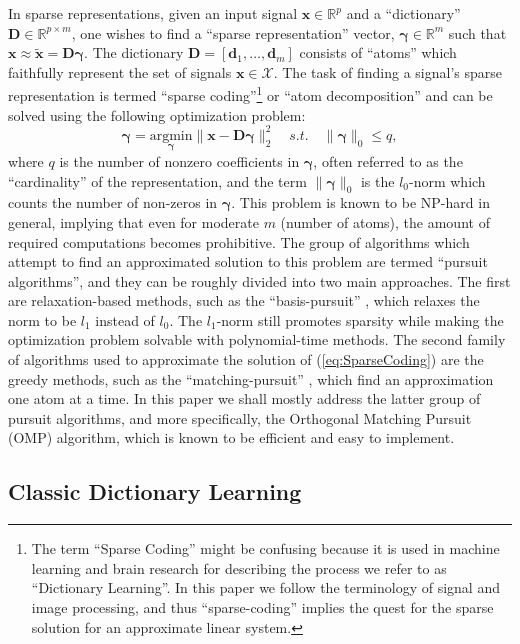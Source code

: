 \documentclass[journal]{IEEEtran}
\newcommand{\bD}{\mathbf{D}}
\newcommand{\bd}{\mathbf{d}}
\newcommand{\bx}{\mathbf{x}}
\newcommand{\cX}{\mathcal{X}}
\newcommand{\bgamma}{\boldsymbol{\gamma}}
\begin{document}
In sparse representations, given an input signal $\bx \in \mathbb{R}^p$ and a ``dictionary'' $\bD \in \mathbb{R}^{p \times m}$, one wishes to find a ``sparse representation'' vector, $\bgamma \in \mathbb{R}^m$ such that $\bx \approx \tilde{\bx} = \bD \bgamma$. The dictionary $\bD = \left[\bd_1,\ldots,\bd_m\right]$ consists of ``atoms'' which faithfully represent the set of signals $\bx \in \cX$. The task of finding a signal's sparse representation is termed ``sparse coding''\footnote{The term ``Sparse Coding'' might be confusing because it is used in machine learning and brain research for describing the process we refer to as ``Dictionary Learning''. In this paper we follow the terminology of signal and image processing, and thus ``sparse-coding'' implies the quest for the sparse solution for an approximate linear system.} or ``atom decomposition'' and can be solved using the following optimization problem:
\begin{equation}\label{eq:SparseCoding}
    \bgamma = \underset{\bgamma}{\text{argmin}} \| \bx - \bD \bgamma \|_2^2 \quad s.t. \quad \| \bgamma \|_0 \leq \mathit{q},
\end{equation}
where $q$ is the number of nonzero coefficients in $\bgamma$, often referred to as the ``cardinality'' of the representation, and the term $\|\bgamma\|_0$ is the $l_0$-norm which counts the number of non-zeros in $\bgamma$. This problem is known to be NP-hard in general, implying that even for moderate $m$ (number of atoms), the amount of required computations becomes prohibitive. The group of algorithms which attempt to find an approximated solution to this problem are termed ``pursuit algorithms'', and they can be roughly divided into two main approaches.
The first are relaxation-based methods, such as the ``basis-pursuit'' \cite{basePursuit}, which relaxes the norm to be $l_1$ instead of $l_0$. The $l_1$-norm still promotes sparsity while making the optimization problem solvable with polynomial-time methods. The second family of algorithms used to approximate the solution of (\ref{eq:SparseCoding}) are the greedy methods, such as the ``matching-pursuit'' \cite{matchPursuit}, which find an approximation one atom at a time. In this paper we shall mostly address the latter group of pursuit algorithms, and more specifically, the Orthogonal Matching Pursuit (OMP) \cite{OMP} algorithm, which is known to be efficient and easy to implement.

\subsection{Classic Dictionary Learning} \label{SS:classicDL}
\end{document}
